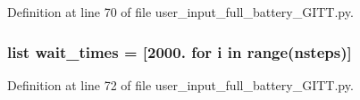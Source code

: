 Definition at line 70 of file user\-\_\-input\-\_\-full\-\_\-battery\-\_\-\-G\-I\-T\-T.\-py.

\hypertarget{namespaceuser__input__full__battery___g_i_t_t_ae584b229c7b1ea3d8330e6038884ffd3}{
\subsubsection[{wait\-\_\-times}]{\setlength{\rightskip}{0pt plus 5cm}list wait\-\_\-times = \mbox{[}2000. for i in range({\bf nsteps})\mbox{]}}}\label{namespaceuser__input__full__battery___g_i_t_t_ae584b229c7b1ea3d8330e6038884ffd3}


Definition at line 72 of file user\-\_\-input\-\_\-full\-\_\-battery\-\_\-\-G\-I\-T\-T.\-py.


